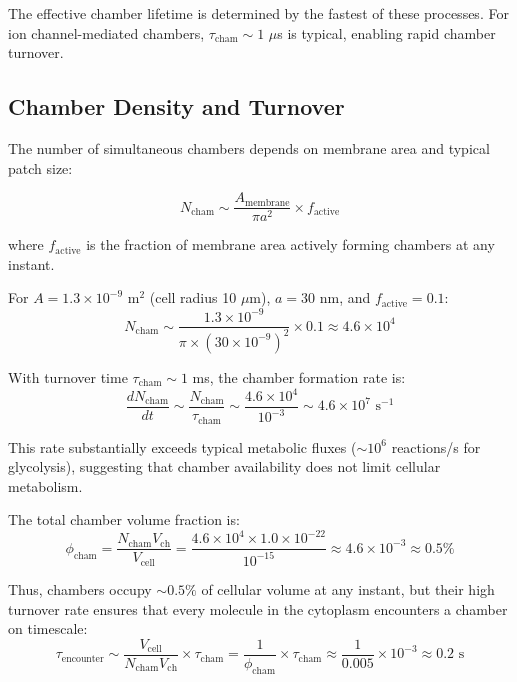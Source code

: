 \documentclass[twocolumn,10pt,aps,prd,superscriptaddress,floatfix,nofootinbib]{revtex4-2}
\theoremstyle{remark}
\begin{document}
The effective chamber lifetime is determined by the fastest of these processes. For ion channel-mediated chambers, $\tau_{\mathrm{cham}} \sim 1$ $\mu$s is typical, enabling rapid chamber turnover.

\subsection{Chamber Density and Turnover}

The number of simultaneous chambers depends on membrane area and typical patch size:

\begin{equation}
N_{\mathrm{cham}} \sim \frac{A_{\mathrm{membrane}}}{\pi a^2} \times f_{\mathrm{active}}
\end{equation}

where $f_{\mathrm{active}}$ is the fraction of membrane area actively forming chambers at any instant.

For $A = 1.3 \times 10^{-9}$ m$^2$ (cell radius 10 $\mu$m), $a = 30$ nm, and $f_{\mathrm{active}} = 0.1$:
\begin{equation}
N_{\mathrm{cham}} \sim \frac{1.3 \times 10^{-9}}{\pi \times (30 \times 10^{-9})^2} \times 0.1 \approx 4.6 \times 10^{4}
\end{equation}

With turnover time $\tau_{\mathrm{cham}} \sim 1$ ms, the chamber formation rate is:
\begin{equation}
\frac{dN_{\mathrm{cham}}}{dt} \sim \frac{N_{\mathrm{cham}}}{\tau_{\mathrm{cham}}} \sim \frac{4.6 \times 10^{4}}{10^{-3}} \sim 4.6 \times 10^{7} \text{ s}^{-1}
\end{equation}

This rate substantially exceeds typical metabolic fluxes ($\sim 10^{6}$ reactions/s for glycolysis), suggesting that chamber availability does not limit cellular metabolism.

The total chamber volume fraction is:
\begin{equation}
\phi_{\mathrm{cham}} = \frac{N_{\mathrm{cham}} V_{\mathrm{ch}}}{V_{\mathrm{cell}}} = \frac{4.6 \times 10^{4} \times 1.0 \times 10^{-22}}{10^{-15}} \approx 4.6 \times 10^{-3} \approx 0.5\%
\end{equation}

Thus, chambers occupy $\sim 0.5\%$ of cellular volume at any instant, but their high turnover rate ensures that every molecule in the cytoplasm encounters a chamber on timescale:
\begin{equation}
\tau_{\mathrm{encounter}} \sim \frac{V_{\mathrm{cell}}}{N_{\mathrm{cham}} V_{\mathrm{ch}}} \times \tau_{\mathrm{cham}} = \frac{1}{\phi_{\mathrm{cham}}} \times \tau_{\mathrm{cham}} \approx \frac{1}{0.005} \times 10^{-3} \approx 0.2 \text{ s}
\end{equation}
\end{document}

